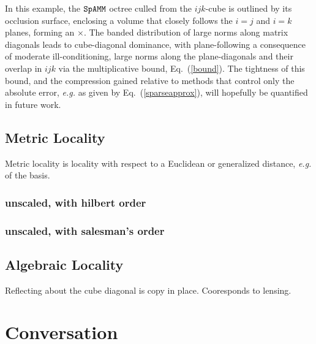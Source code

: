 \documentclass[letterpaper,twocolumn,amsmath,amsfont,amssymb,english,aps,jcp,preprintnumbers,groupaddress,nofootinbib,tightenlines]{revtex4}
\begin{document}
In this example, the $\tt SpAMM$ octree culled from the $ijk$-cube is outlined by its occlusion surface, enclosing 
a volume that closely follows the $i=j$ and $i=k$ planes, forming an $\times$.  The banded distribution
of large norms along  matrix diagonals leads to cube-diagonal dominance, with plane-following 
a consequence of moderate ill-conditioning,  large norms along the plane-diagonals and their overlap in $ijk$
via the multiplicative bound, Eq.~(\ref{bound}). The tightness of this bound, and the compression gained relative
to  methods that control only the absolute error, {\em e.g.} as given by Eq.~(\ref{sparseapprox}), will hopefully
be quantified in future work. 



\subsection{Metric Locality} 
Metric locality is locality with respect to a Euclidean or generalized distance, {\em e.g.} of the basis.  

\subsubsection{unscaled, with hilbert order}

\subsubsection{unscaled, with salesman's order}

\subsection{Algebraic  Locality} 

Reflecting about the cube diagonal is copy in place.  Cooresponds to lensing. 


\section{Conversation}



\end{document}
